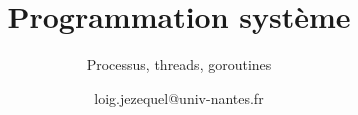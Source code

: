 \documentclass{beamer}
\title{Programmation système}
\author{Processus, threads, goroutines}
\date{loig.jezequel@univ-nantes.fr}
\begin{document}
\frame{
\maketitle
}
\end{document}
